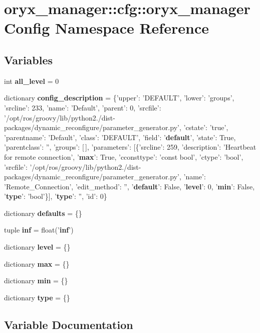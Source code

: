 \section{oryx\-\_\-manager\-:\-:cfg\-:\-:oryx\-\_\-manager\-Config \-Namespace \-Reference}
\label{namespaceoryx__manager_1_1cfg_1_1oryx__managerConfig}
\subsection*{\-Variables}
\begin{DoxyCompactItemize}
\item 
int {\bf all\-\_\-level} = 0
\item 
dictionary {\bf config\-\_\-description} = \{'upper'\-: '\-D\-E\-F\-A\-U\-L\-T', 'lower'\-: 'groups', 'srcline'\-: 233, 'name'\-: '\-Default', 'parent'\-: 0, 'srcfile'\-: '/opt/ros/groovy/lib/python2./dist-\/packages/dynamic\-\_\-reconfigure/parameter\-\_\-generator.\-py', 'cstate'\-: 'true', 'parentname'\-: '\-Default', 'class'\-: '\-D\-E\-F\-A\-U\-L\-T', 'field'\-: '{\bf default}', 'state'\-: \-True, 'parentclass'\-: '', 'groups'\-: [$\,$], 'parameters'\-: [\{'srcline'\-: 259, 'description'\-: '\-Heartbeat for remote connection', '{\bf max}'\-: \-True, 'cconsttype'\-: 'const bool', 'ctype'\-: 'bool', 'srcfile'\-: '/opt/ros/groovy/lib/python2./dist-\/packages/dynamic\-\_\-reconfigure/parameter\-\_\-generator.\-py', 'name'\-: '\-Remote\-\_\-\-Connection', 'edit\-\_\-method'\-: '', '{\bf default}'\-: \-False, '{\bf level}'\-: 0, '{\bf min}'\-: \-False, '{\bf type}'\-: 'bool'\}], '{\bf type}'\-: '', 'id'\-: 0\}
\item 
dictionary {\bf defaults} = \{\}
\item 
tuple {\bf inf} = float('{\bf inf}')
\item 
dictionary {\bf level} = \{\}
\item 
dictionary {\bf max} = \{\}
\item 
dictionary {\bf min} = \{\}
\item 
dictionary {\bf type} = \{\}
\end{DoxyCompactItemize}


\subsection{\-Variable \-Documentation}
